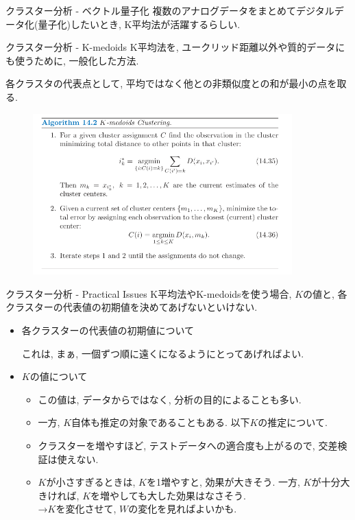 \documentclass[dvipdfmx,8pt]{beamer}
\begin{document}
  \begin{frame}{クラスター分析 - ベクトル量子化}
    複数のアナログデータをまとめてデジタルデータ化(量子化)したいとき, K平均法が活躍するらしい.
  \end{frame}
  \begin{frame}{クラスター分析 - K-medoids}
    K平均法を, ユークリッド距離以外や質的データにも使うために, 一般化した方法.

    各クラスタの代表点として, 平均ではなく他との非類似度との和が最小の点を取る.
    \begin{figure}[htb]
      \centering
      \includegraphics[width=10cm,clip]{images/kmedoids.png}
    \end{figure}
  \end{frame}
  \begin{frame}{クラスター分析 - Practical Issues}
    K平均法やK-medoidsを使う場合, $K$の値と, 各クラスターの代表値の初期値を決めてあげないといけない.
    \begin{itemize}
      \item 各クラスターの代表値の初期値について

      これは, まぁ, 一個ずつ順に遠くになるようにとってあげればよい.

      \item $K$の値について
      \begin{itemize}
        \item この値は, データからではなく, 分析の目的によることも多い.
        \item 一方, $K$自体も推定の対象であることもある. 以下$K$の推定について.

        \item クラスターを増やすほど, テストデータへの適合度も上がるので, 交差検証は使えない.

        \item $K$が小さすぎるときは, $K$を1増やすと, 効果が大きそう.
        一方, $K$が十分大きければ, $K$を増やしても大した効果はなさそう. \\
        →$K$を変化させて, $W$の変化を見ればよいかも.
      \end{itemize}
    \end{itemize}
  \end{frame}
\end{document}
